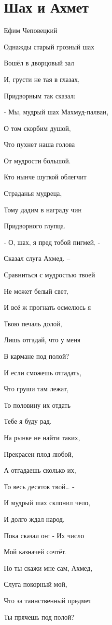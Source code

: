 \documentclass[12pt]{article}
\theoremstyle{definition}
\begin{document}
\section{Шах и Ахмет}

Ефим Чеповецкий

Однажды старый грозный шах

Вошёл в дворцовый зал

И, грусти не тая в глазах,

Придворным так сказал:

- Мы, мудрый шах Махмуд-палван,

О том скорбим душой,

Что пухнет наша голова

От мудрости большой.

Кто нынче шуткой облегчит

Страданья мудреца,

Тому дадим в награду чин

Придворного глупца.



- О, шах, я пред тобой пигмей, -

Сказал слуга Ахмед. –

Сравниться с мудростью твоей

Не может белый свет,

И всё ж прогнать осмелюсь я

Твою печаль долой,

Лишь отгадай, что у меня

В кармане под полой?

И если сможешь отгадать,

Что груши там лежат,

То половину их отдать

Тебе я буду рад.

На рынке не найти таких,

Прекрасен плод любой,

А отгадаешь сколько их,

То весь десяток твой… -

И мудрый шах склонил чело,

И долго ждал народ,

Пока сказал он: - Их число

Мой казначей сочтёт.

Но ты скажи мне сам, Ахмед,

Слуга покорный мой,

Что за таинственный предмет

Ты прячешь под полой?
\end{document}
